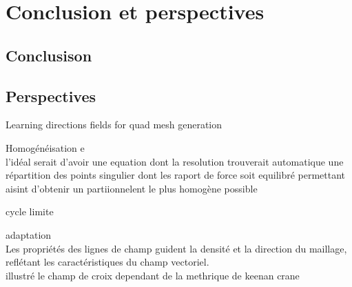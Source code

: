 \chapter{Conclusion et perspectives}
\label{chap:conclusion}

\section*{Conclusison}

\section*{Perspectives}

Learning directions fields for quad mesh generation

\[\]
Homogénéisation e\\
l'idéal serait d'avoir une equation dont la resolution trouverait automatique une répartition des points singulier dont les raport de force soit equilibré permettant aisint d'obtenir un partiionnelent le plus homogène possible
\[\]

cycle limite\\
\[\]

adaptation\\
       Les propriétés des lignes de champ guident la densité et la direction du maillage, reflétant les caractéristiques du champ vectoriel.\\
       illustré le champ de croix dependant de la methrique de keenan crane
\[\]
